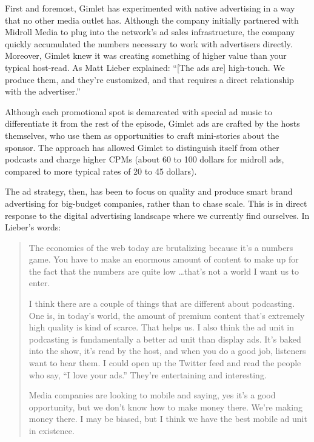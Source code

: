 \documentclass[notoc, symmetric, nobib, nols]{towcenter-guideto-book}
\begin{document}
First and foremost, Gimlet has experimented with native advertising in a way that no other media outlet has. Although the company initially partnered with Midroll Media to plug into the network's ad sales infrastructure, the company quickly accumulated the numbers necessary to work with advertisers directly. Moreover, Gimlet knew it was creating something of higher value than your typical host-read. As Matt Lieber explained: ``[The ads are] high-touch. We produce them, and they're customized, and that requires a direct relationship with the advertiser.''\autocite{lieber} 

Although each promotional spot is demarcated with special ad music to differentiate it from the rest of the episode, Gimlet ads are crafted by the hosts themselves, who use them as opportunities to craft mini-stories about the sponsor. The approach has allowed Gimlet to distinguish itself from other podcasts and charge higher CPMs (about 60 to 100 dollars for midroll ads, compared to more typical rates of 20 to 45 dollars).\autocites{matt, cjr} 

The ad strategy, then, has been to focus on quality and produce smart brand advertising for big-budget companies, rather than to chase scale. This is in direct response to the digital advertising landscape where we currently find ourselves. In Lieber's words:

\begin{quote}
The economics of the web today are brutalizing because it's a numbers game. You have to make an enormous amount of content to make up for the fact that the numbers are quite low \ldots that's not a world I want us to enter. 

I think there are a couple of things that are different about podcasting. One is, in today's world, the amount of premium content that's extremely high quality is kind of scarce. That helps us. I also think the ad unit in podcasting is fundamentally a better ad unit than display ads. It's baked into the show, it's read by the host, and when you do a good job, listeners want to hear them. I could open up the Twitter feed and read the people who say, ``I love your ads.'' They're entertaining and interesting. 

Media companies are looking to mobile and saying, yes it's a good opportunity, but we don't know how to make money there. We're making money there. I may be biased, but I think we have the best mobile ad unit in existence.\autocite{lieber}
\end{quote}
\end{document}
